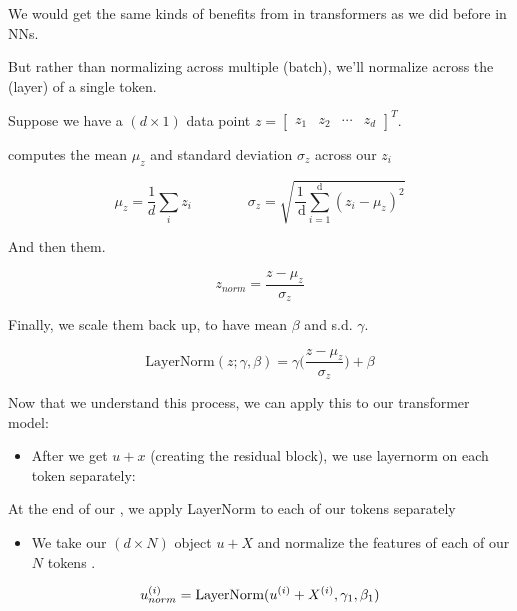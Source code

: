
        We would get the same kinds of benefits from  in transformers as we did before in NNs. 

        But rather than normalizing across multiple  (batch), we'll normalize across the  (layer) of a single token.\\

        \begin{kequation}
            Suppose we have a $(d \times 1)$ data point $z = \begin{bmatrix}
                z_1 & z_2 & \cdots & z_d
            \end{bmatrix}^T$. 
            
             computes the mean $\mu_z$ and standard deviation $\sigma_z$ across our  $z_i$

            $$\mu_z = \frac{1}{d} \sum_i z_i \qquad \qquad \sigma_z=\sqrt{\frac{1}{\mathrm{~d}} \sum_{i=1}^{\mathrm{d}}\left(z_i-\mu_z\right)^2} $$

            And then  them.

            $$z_{norm} = \frac{z - \mu_z}{\sigma_z}$$

            Finally, we scale them back up, to have mean $\beta$ and s.d. $\gamma$.

            $$\text{LayerNorm}(z; \gamma, \beta) = \gamma \Big( \frac{z - \mu_z}{\sigma_z} \Big) + \beta $$
        \end{kequation}


        Now that we understand this process, we can apply this to our transformer model:

        \begin{itemize}
            \item After we get $u+x$ (creating the residual block), we use layernorm on each token separately:\\
        \end{itemize}

        \begin{concept}
            At the end of our , we apply LayerNorm to each of our tokens separately

            \begin{itemize}
                \item We take our $(d \times N)$ object $u+X$ and normalize the features of each of our $N$ tokens .
            \end{itemize}

            $$u_{norm}^{(i)} = \text{LayerNorm}(u^{(i)}+ X^{(i)}, \gamma_1, \beta_1)$$
        \end{concept}

